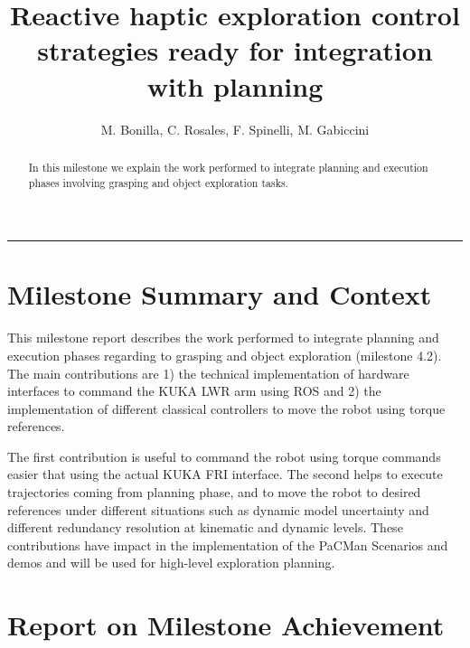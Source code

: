 \documentclass[a4paper,11pt,pdf]{pacmanreport}
\title{Reactive haptic exploration control strategies ready for integration with planning}
\author{M. Bonilla, C. Rosales, F. Spinelli, M. Gabiccini}
\begin{document}
\maketitle

\begin{abstract}
\noindent In this milestone we explain the work performed to integrate planning and execution phases involving grasping and object exploration tasks. 
\end{abstract}


\vspace{.2em}
\hrule

\vspace{.2em}
\footnotesize

\tableofcontents

\normalsize

\newpage

\section{Milestone Summary and Context}

This milestone report describes the work performed to integrate planning and execution phases regarding to grasping and object exploration (milestone 4.2). The main contributions are 1) the technical implementation of hardware interfaces to command the KUKA LWR arm using ROS and 2)  the implementation of different classical controllers to move the robot using torque references.

The first contribution is useful to command the robot using torque commands easier that using the actual KUKA FRI interface. The second helps to execute trajectories coming from planning phase, and to move the robot to desired references under different situations such as dynamic model uncertainty and different redundancy resolution at kinematic and dynamic levels. These contributions have impact in the implementation of the PaCMan Scenarios and demos and will be used for high-level exploration planning.




\section{Report on Milestone Achievement}
\end{document}
